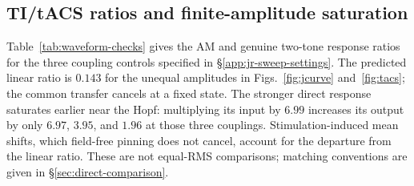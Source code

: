 \subsection{TI/tACS ratios and finite-amplitude saturation}\label{supp:tacs-saturation}
Table~\ref{tab:waveform-checks} gives the AM and genuine two-tone response
ratios for the three coupling controls specified in
\S\ref{app:jr-sweep-settings}. The predicted linear ratio is $0.143$ for
the unequal amplitudes in Figs.~\ref{fig:jcurve} and~\ref{fig:tacs}; the
common transfer cancels at a fixed state. The stronger direct response
saturates earlier near the Hopf: multiplying its input by $6.99$ increases
its output by only $6.97$, $3.95$, and $1.96$ at those three couplings.
Stimulation-induced mean shifts, which field-free pinning does not cancel,
account for the departure from the linear ratio. These are not equal-RMS
comparisons; matching conventions are given in \S\ref{sec:direct-comparison}.
